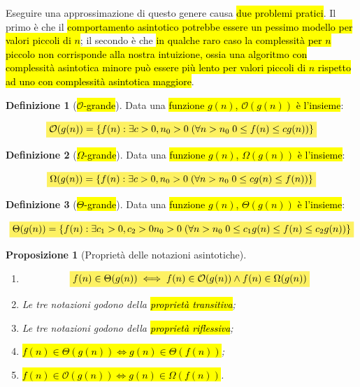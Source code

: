 \documentclass[a4paper,11pt,oneside]{article}
\theoremstyle{plain}
\newtheorem{prop}{Proposizione}[section]
\theoremstyle{definition}
\newtheorem{defn}{Definizione}[section]
\theoremstyle{remark}
\newcommand{\mhl}[1]{\colorbox{hlcolor}{$\displaystyle #1$}}
\begin{document}
Eseguire una approssimazione di questo genere causa \hl{due problemi pratici}.
Il primo è che il \hl{comportamento asintotico potrebbe essere un pessimo
modello per valori piccoli di $n$}; il secondo è che \hl{in qualche raro caso la
complessità per $n$ piccolo non corrisponde alla nostra intuizione, ossia una
algoritmo con complessità asintotica minore può essere più lento per valori
piccoli di $n$ rispetto ad uno con complessità asintotica maggiore}.

\begin{defn}[\hl{$\mathcal{O}$-grande}]\label{def:o-grande}
  Data una \hl{funzione $g(n)$, $\mathcal{O}(g(n))$ è l'insieme}:

  \begin{equation}
    \mhl{
      \mathcal{O}(g(n)) = \{ f(n) : \exists c>0, n_0>0 \; (\forall n>n_0 \;
        0 \leq f(n) \leq cg(n)) \}
    }
  \end{equation}
\end{defn}

\begin{defn}[\hl{$\Omega$-grande}]\label{def:omega-grande}
  Data una \hl{funzione $g(n)$, $\Omega(g(n))$ è l'insieme}:

  \begin{equation}
    \mhl{
      \Omega(g(n)) = \{ f(n) : \exists c>0, n_0>0 \; (\forall n>n_0 \;
        0 \leq cg(n) \leq f(n)) \}
    }
  \end{equation}
\end{defn}

\begin{defn}[\hl{$\Theta$-grande}]\label{def:theta-grande}
  Data una \hl{funzione $g(n)$, $\Theta(g(n))$ è l'insieme}:

  \begin{equation}
    \mhl{
      \Theta(g(n)) = \{ f(n) : \exists c_1>0, c_2>0 n_0>0 \; (\forall n>n_0 \;
        0 \leq c_1 g(n) \leq f(n) \leq c_2 g(n)) \}
    }
  \end{equation}
\end{defn}

\begin{prop}[Proprietà delle notazioni asintotiche]
  \begin{enumerate}
    \item
      \[
        \mhl{
          f(n) \in \Theta(g(n)) \iff f(n) \in \mathcal{O}(g(n)) \land
          f(n) \in \Omega(g(n))
        }
      \]
    \item Le tre notazioni godono della \hl{proprietà transitiva};
    \item Le tre notazioni godono della \hl{proprietà riflessiva};
    \item \hl{$f(n) \in \Theta(g(n)) \iff g(n) \in \Theta(f(n))$};
    \item \hl{$f(n) \in \mathcal{O}(g(n)) \iff g(n) \in \Omega(f(n))$}.
  \end{enumerate}
\end{prop}
\end{document}
